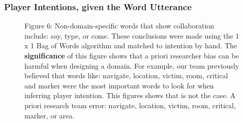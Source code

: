 \subsubsection{Player Intentions, given the Word Utterance}





\begin{figure}[h!]
    \centering
    \caption{Figure 6: Non-domain-specific words that show collaboration include: say, type, or come. These conclusions were made using the 1 x 1 Bag of Words algorithm and matched to intention by hand. The \textbf{significance} of this figure shows that a priori researcher bias can be harmful when designing a domain. For example, our team previously believed that words like: navigate, location, victim, room, critical and marker were the most important words to look for when inferring player intention. This figures shows that is not the case. A priori research team error: navigate, location, victim, room, critical, marker, or area.}
    \end{figure}
    
   

